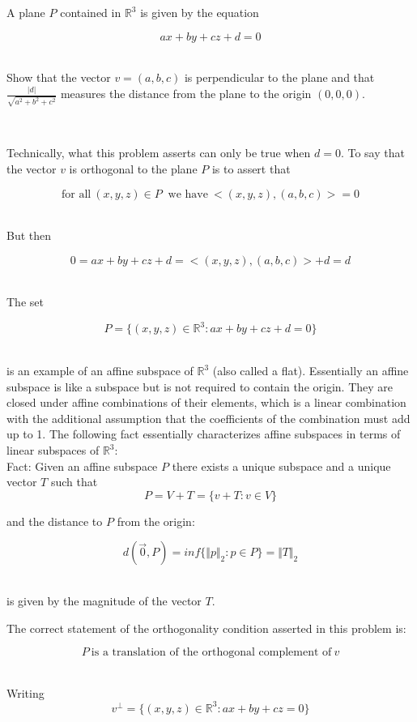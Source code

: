 \documentclass[12pt,letterpaper]{hmcpset}
\begin{document}
\begin{problem}
A plane $P$ contained in $\mathbb{R}^3$ is given by the equation

\[a x + by + c z + d = 0\]\

Show that the vector $v = (a,b,c)$ is perpendicular to the plane and that  $\frac{\vert d \vert}{\sqrt{a^2+b^2+c^2}}$ measures the distance from the plane to the origin $(0,0,0)$.
\end{problem}

\begin{solution}\

Technically, what this problem asserts can only be true when $d = 0$.   To say that the vector $v$ is orthogonal to the plane $P$ is to assert that 

\[ \text{for all} \  (x,y,z) \in P \ \text{ we have} \ <(x,y,z), (a,b,c)> = 0\]\

But then

\[ 0 = ax+by+cz +d = <(x,y,z),(a,b,c)> + d = d \]\

The set 

\[ P = \{(x,y,z) \in \mathbb{R}^3: ax+by+cz + d =0 \} \]\

is an example of an affine subspace of $\mathbb{R}^3$ (also called a flat).  Essentially an affine subspace is like a subspace but is not required to contain the origin.  They are closed under affine combinations of their elements, which is a linear combination with the additional assumption that the  coefficients of the combination must add up to 1.  The following fact essentially characterizes affine subspaces in terms of linear subspaces of $\mathbb{R}^3$:\\

{\large Fact:} Given an affine subspace $P$ there exists a unique subspace and a unique vector $T$ such that 
\[ P = V+T = \{ v + T : v \in V\}\]

and the distance to $P$ from the origin: 

\[d(\vec0, P) = inf \{ \Vert p \Vert_2 : p \in P \}= \Vert T \Vert_2\]\

 is given by the magnitude of the vector $T$.

\newpage

The correct statement of the orthogonality condition asserted in this problem is:

\[P \ \text{is a translation of the orthogonal complement of} \ v \]\

  Writing  
\[v^{\bot} = \{ (x,y,z) \in \mathbb{R}^3: ax+by+cz =0 \}\]\


\end{solution}
\end{document}
